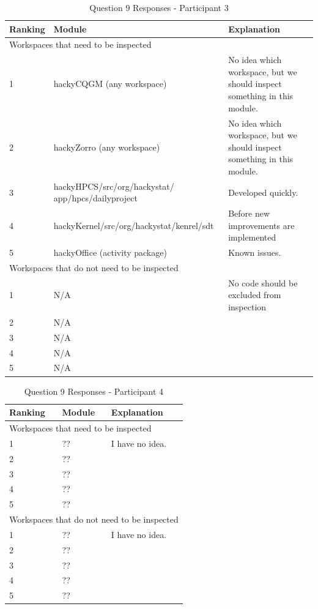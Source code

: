 \begin{table}[!h]
  \begin{center}
    \caption{Question 9 Responses - Participant 3}
    \label{tab:pre-selection-questionnaire-results-9-p3}
    \begin{tabular}{|p{2.0cm}|p{7.0cm}|p{4.0cm}|} \hline
{\bf Ranking} & {\bf Module} & {\bf Explanation} \\ \hline
\multicolumn{3}{|p{13.0cm}|}{Workspaces that need to be inspected} \\ \hline
1 & hackyCQGM (any workspace) & No idea which workspace, but we should
inspect something in this module. \\ \hline
2 & hackyZorro (any workspace) & No idea which workspace, but we should
inspect something in this module. \\ \hline
3 & hackyHPCS/src/org/hackystat/ app/hpcs/dailyproject & Developed
quickly. \\ \hline
4 & hackyKernel/src/org/hackystat/kenrel/sdt & Before new improvements are
implemented \\ \hline
5 & hackyOffice (activity package) & Known issues. \\ \hline
\multicolumn{3}{|p{13.0cm}|}{Workspaces that do not need to be inspected} \\ \hline
1 & N/A & No code should be excluded from inspection \\ \hline
2 & N/A & \\ \hline
3 & N/A & \\ \hline
4 & N/A & \\ \hline
5 & N/A & \\ \hline
    \end{tabular}
  \end{center}
\end{table}

\begin{table}[!h]
  \begin{center}
    \caption{Question 9 Responses - Participant 4}
    \label{tab:pre-selection-questionnaire-results-9-p4}
    \begin{tabular}{|p{2.0cm}|p{7.0cm}|p{4.0cm}|} \hline
{\bf Ranking} & {\bf Module} & {\bf Explanation} \\ \hline
\multicolumn{3}{|p{13.0cm}|}{Workspaces that need to be inspected} \\ \hline
1 & ?? & I have no idea. \\ \hline
2 & ?? & \\ \hline
3 & ?? & \\ \hline
4 & ?? & \\ \hline
5 & ?? & \\ \hline
\multicolumn{3}{|p{13.0cm}|}{Workspaces that do not need to be inspected} \\ \hline
1 & ?? & I have no idea. \\ \hline
2 & ?? & \\ \hline
3 & ?? & \\ \hline
4 & ?? & \\ \hline
5 & ?? & \\ \hline
    \end{tabular}
  \end{center}
\end{table}


